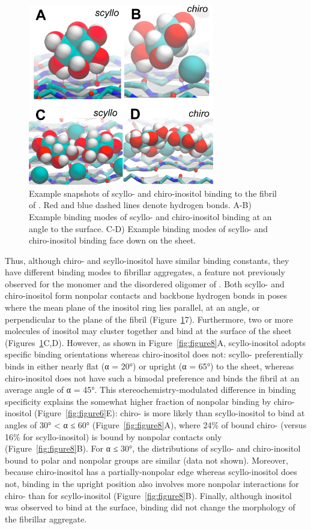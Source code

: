 \begin{figure}[htbp]
  \centering
  \includegraphics[width=3.2in]{figures/results1/GA4_paper_figures_submitted-7}
  \caption[Binding of scyllo- and chiro-inositol to the fibrillar aggregate of \gafour.]{Example snapshots of scyllo- and chiro-inositol binding to the fibril of \gafour. Red and blue dashed lines denote hydrogen bonds. A-B) Example binding modes of scyllo- and chiro-inositol binding at an angle to the surface. C-D) Example binding modes of scyllo- and chiro-inositol binding face down on the sheet.}
   \label{fig:figure7}
\end{figure}

Thus, although chiro- and scyllo-inositol have similar binding constants, they have different binding modes to fibrillar aggregates, a feature not previously observed for the monomer and the disordered oligomer of \gafour. Both scyllo- and chiro-inositol form nonpolar contacts and backbone hydrogen bonds in poses where the mean plane of the inositol ring lies parallel, at an angle, or perpendicular to the plane of the fibril (Figure~\ref{fig:figure7}7). Furthermore, two or more molecules of inositol may cluster together and bind at the surface of the sheet (Figures~\ref{fig:figure7}C,D). However, as shown in Figure~\ref{fig:figure8}A, scyllo-inositol adopts specific binding orientations whereas chiro-inositol does not: scyllo- preferentially binds in either nearly flat (α = 20°) or upright (α = 65°) to the sheet, whereas chiro-inositol does not have such a bimodal preference and binds the fibril at an average angle of α = 45°. This stereochemistry-modulated difference in binding specificity explains the somewhat higher fraction of nonpolar binding by chiro-inositol (Figure~\ref{fig:figure6}E): chiro- is more likely than scyllo-inositol to bind at angles of 30° < α ≤ 60° (Figure~\ref{fig:figure8}A), where 24\% of bound chiro- (versus 16\% for scyllo-inositol) is bound by nonpolar contacts only (Figure~\ref{fig:figure8}B). For α ≤ 30°, the distributions of scyllo- and chiro-inositol bound to polar and nonpolar groups are similar (data not shown). Moreover, because chiro-inositol has a partially-nonpolar edge whereas scyllo-inositol does not, binding in the upright position also involves more nonpolar interactions for chiro- than for scyllo-inositol (Figure~\ref{fig:figure8}B). Finally, although inositol was observed to bind at the surface, binding did not change the morphology of the fibrillar aggregate.


